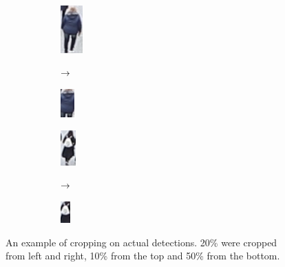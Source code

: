 \begin{figure}
    \centering
     \hfill
     \begin{subfigure}[t]{0.28\textwidth} %
        \centering
        \begin{subfigure}[c]{0.3\textwidth}
          \centering
          \includegraphics[]{img/background_filter/1_original.png}
        \end{subfigure}
        \hfill
        \begin{subfigure}[c]{0.3\textwidth}
          \centering
          $\rightarrow$
        \end{subfigure}
        \hfill
        \begin{subfigure}[c]{0.3\textwidth}
          \centering
          \includegraphics[]{img/background_filter/1_small.png}
        \end{subfigure}
     \end{subfigure}
     \hfill
     \begin{subfigure}[t]{0.28\textwidth} %
        \centering
        \begin{subfigure}[c]{0.3\textwidth}
          \centering
          \includegraphics[]{img/background_filter/2_original.png}
        \end{subfigure}
        \hfill
        \begin{subfigure}[c]{0.3\textwidth}
          \centering
          $\rightarrow$
        \end{subfigure}
        \hfill
        \begin{subfigure}[c]{0.3\textwidth}
          \centering
          \includegraphics[]{img/background_filter/2_small.png}
        \end{subfigure}
     \end{subfigure}
     \hfill \hspace{0.1mm}

    \caption[An example of cropping on actual detections]{An example of cropping on actual detections. 20\% were cropped from left and right, 10\% from the top and 50\% from the bottom.}
    \label{fig:crop_example}
\end{figure}

